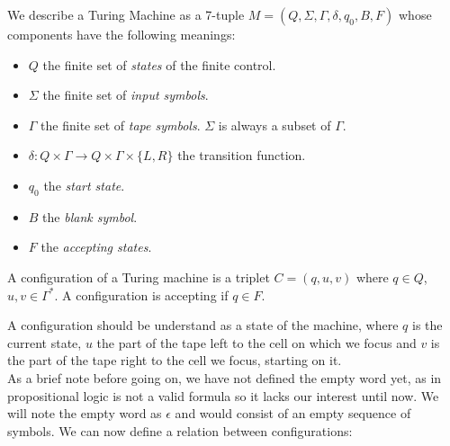 \begin{definition} We describe a Turing Machine as a 7-tuple $M=(Q, \Sigma, \Gamma, \delta, q_0, B, F)$ whose components have the following meanings:
  \begin{itemize}
  \item $Q$ the finite set of \emph{states} of the finite control.
  \item $\Sigma$ the finite set of \emph{input symbols}.
  \item $\Gamma$ the finite set of \emph{tape symbols}. $\Sigma$ is always a subset of $\Gamma$.
  \item  $\delta: Q\times \Gamma \to Q\times\Gamma\times\{L,R\}$ the transition function.
  \item $q_0$ the \emph{start state}.
  \item $B$ the \emph{blank symbol}.
  \item $F$ the \emph{accepting states}.
  \end{itemize}

  A configuration of a Turing machine is a triplet $C=(q,u,v)$ where $q\in Q$, $u,v\in \Gamma^*$. A configuration is accepting if $q\in F$.
\end{definition}

A configuration should be understand as a state of the machine, where $q$ is the current state, $u$ the part of the tape left to the cell on which we focus and $v$ is the part of the tape right to the cell we focus, starting on it.\\

As a brief note before going on, we have not defined the empty word yet, as in propositional logic is not a valid formula so it lacks our interest until now. We will note the empty word as $\epsilon$ and would consist of an empty sequence of symbols. We can  now define a relation between configurations:

